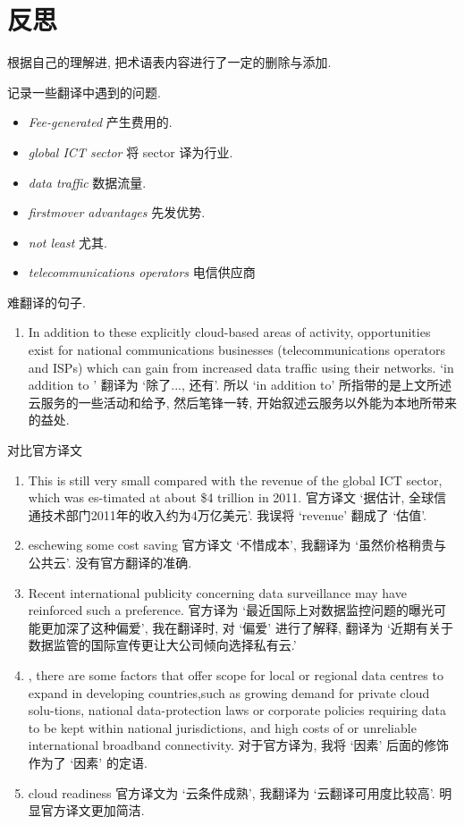 \documentclass[a4paper, UTF8, 12pt]{article}
\begin{document}
\section{反思}

根据自己的理解进, 把术语表内容进行了一定的删除与添加.

记录一些翻译中遇到的问题.

\begin{itemize}
    \item \emph{Fee-generated} 产生费用的.
    \item \emph{global ICT sector} 将 sector 译为行业. 
    \item \emph{data traffic} 数据流量.
    \item \emph{firstmover advantages} 先发优势.
    \item \emph{not least} 尤其.
    \item \emph{telecommunications operators} 电信供应商
\end{itemize}

难翻译的句子.

\begin{enumerate}
    \item In addition to these explicitly cloud-based areas of activity, opportunities exist for national communications businesses (telecommunications operators and ISPs) which can gain from increased data traffic using their networks. `in addition to ' 翻译为 `除了..., 还有'. 所以 `in addition to' 所指带的是上文所述云服务的一些活动和给予, 然后笔锋一转, 开始叙述云服务以外能为本地所带来的益处.  
\end{enumerate}

对比官方译文

\begin{enumerate}
    \item This is still very small compared with the revenue of the global ICT sector, which was es-timated at about \$4 trillion in 2011. 官方译文 `据估计, 全球信通技术部门2011年的收入约为4万亿美元'. 我误将 `revenue' 翻成了 `估值'.
    \item eschewing some cost saving 官方译文 `不惜成本', 我翻译为 `虽然价格稍贵与公共云'. 没有官方翻译的准确.
    \item Recent international publicity concerning data surveillance may have reinforced such a preference. 官方译为 `最近国际上对数据监控问题的曝光可能更加深了这种偏爱', 我在翻译时, 对 `偏爱' 进行了解释, 翻译为 `近期有关于数据监管的国际宣传更让大公司倾向选择私有云.'
    \item , there are some factors that offer scope for local or regional data centres to expand in developing countries,such as growing demand for private cloud solu-tions, national data-protection laws or corporate policies requiring data to be kept within national jurisdictions, and high costs of or unreliable international broadband connectivity. 对于官方译为, 我将 `因素' 后面的修饰作为了 `因素' 的定语.
    \item cloud readiness 官方译文为 `云条件成熟', 我翻译为 `云翻译可用度比较高'. 明显官方译文更加简洁.
\end{enumerate}
\end{document}

